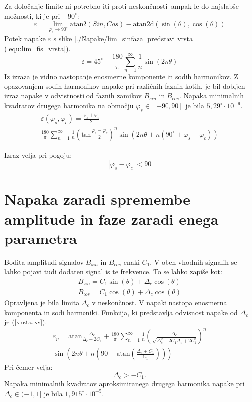 Za določanje limite ni potrebno iti proti neskončnosti, ampak le do najslabše možnosti, ki je pri $\pm 90^\circ$:
\begin{equation}
\label{equ:fis_lim}
\varepsilon = \lim_{\varphi_{s} \rightarrow 90^\circ} \mathrm{atan2}(Sin ,Cos)- \mathrm{atan2d}(\sin(\theta),\cos(\theta))
\end{equation}
Potek napake $\varepsilon$ s slike \ref{./Napake/lim_sinfaza} predstavi vrsta (\ref{equ:lim_fis_vrsta}).
\begin{equation}
\label{equ:lim_fis_vrsta}
\varepsilon = 45^\circ - \frac{180}{\pi}\sum_{n=1}^{\infty}\frac{1}{n} \sin (2n \theta)
\end{equation} 
Iz  izraza je vidno nastopanje enosmerne komponente in sodih harmonikov. Z opazovanjem sodih harmonikov napake pri različnih faznih kotih, je bil dobljen izraz napake v odvistnosti od faznih zamikov $B_{sin}$ in $B_{cos}$. Napaka minimalnih kvadratov drugega harmonika na območju $\varphi_{s} \in [-90, 90]$ je bila $5,29^\circ \cdot 10^{-9}$.
\begin{multline}
\label{equ:fis_err}
\varepsilon(\varphi_{s},\varphi_{c}) = \frac{\varphi_{s}+\varphi_{c}}{2}+\\ \frac{180}{\pi}\sum_{n=1}^{\infty}\frac{1}{n} (\mathrm{tan}\frac{\varphi_{s}-\varphi_{c}}{2})^n \sin (2n \theta+n(90^\circ +\varphi_{s}+\varphi_{c}))
\end{multline}

Izraz velja pri pogoju:
$$|\varphi_{s}-\varphi_{c}|<90$$

\section{Napaka zaradi spremembe amplitude in faze zaradi enega parametra}
\label{izpeljava_atan_napake_staticne}
Bodita amplitudi signalov $B_{sin}$ in $B_{cos}$ enaki $C_1$. V obeh vhodnih signalih se lahko pojavi tudi dodaten signal is te frekvence. To se lahko zapiše kot:
\begin{eqnarray}
\label{xs_analit}
B_{sin} = C_1 \sin(\theta) + \Delta_c \cos(\theta) \\
B_{cos} = C_1 \cos(\theta) + \Delta_c \cos(\theta)
\end{eqnarray}
Opravljena je bila limita $\Delta_c$ v neskončnost. V napaki nastopa enosmerna komponenta in sodi harmoniki. Funkcija, ki predstavlja odvisnost napake od $\Delta_c$ je (\ref{vrsta:xs}).
\begin{equation}
	\label{vrsta:xs}
	\begin{split}
	\varepsilon_p = \mathrm{atan}\frac{\Delta_c}{\Delta_c+2C_1}+\frac{180}{\pi} \sum_{n=1}^{\infty}\frac{1}{n} (\frac{\Delta_c}{\sqrt{\Delta_c^2+2 C_1\Delta_c+2C_1^2}})^n
	\\\sin (2n \theta+n (90+ \mathrm{ atan}(\frac{\Delta_c+C_1}{C_1})))\end{split}
\end{equation}
Pri čemer velja:
$$\Delta_c > -C_1.$$
Napaka minimalnih kvadratov aproksimiranega drugega harmonika napake pri $\Delta_c \in (-1,1]$ je bila $1,915^\circ \cdot 10^{-5}$.

